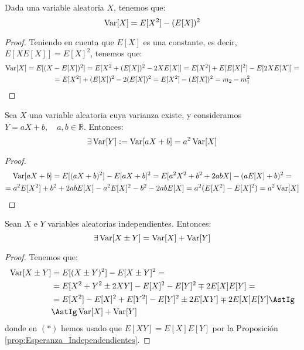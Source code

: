 \begin{prop}
    Dada una variable aleatoria $X$, tenemos que:
    \begin{equation*}
        \operatorname{Var}[X] = E[X^2] - (E[X])^2
    \end{equation*}
\end{prop}
\begin{proof}
    Teniendo en cuenta que $E[X]$ es una constante, es decir, $E[XE[X]]=E[X]^2$, tenemos que:
    \begin{multline*}
        \operatorname{Var}[X] = E[(X-E[X])^2] = E[X^2 + (E[X])^2 - 2XE[X]]
        = E[X^2] + E[E[X]^2] - E[2XE[X]] =\\=
        E[X^2] + (E[X])^2 -2(E[X])^2
        = E[X^2] - (E[X])^2 = m_2-m_1^2
    \end{multline*}
\end{proof}


\begin{prop}
    Sea $X$ una variable aleatoria cuya varianza existe, y consideramos $Y=aX+b,\quad a,b\in \mathbb{R}$. Entonces:
    \begin{equation*}
        \exists \operatorname{Var}[Y] := \operatorname{Var}[aX+b] = a^2\operatorname{Var}[X]
    \end{equation*}
\end{prop}
\begin{proof}
    \begin{multline*}
        \operatorname{Var}[aX+b]
        = E[(aX+b)^2] -E[aX+b]^2
        = E[a^2X^2 + b^2 +2abX] - (aE[X]+b)^2
        =\\= a^2E[X^2] + b^2 +2abE[X] -a^2E[X]^2 -b^2 -2abE[X] =  a^2(E[X^2] - E[X]^2) = a^2\operatorname{Var}[X]
    \end{multline*}
\end{proof}


\begin{prop}
    Sean $X$ e $Y$ variables aleatorias independientes. Entonces:
    \begin{equation*}
        \exists  \operatorname{Var}[X\pm Y] = \operatorname{Var}[X] + \operatorname{Var}[Y]
    \end{equation*}
\end{prop}
\begin{proof}
    Tenemos que:
    \begin{align*}
        \Var[X \pm Y] &= E[(X\pm Y)^2] - E[X\pm Y]^2
        =\\&= E[X^2 + Y^2 \pm 2XY] - E[X]^2 - E[Y]^2 \mp 2E[X]E[Y]
        =\\&= E[X^2] - E[X]^2 + E[Y^2] -E[Y]^2 \pm 2E[XY] \mp 2E[X]E[Y]
        \AstIg\\&\AstIg \Var[X] + \Var[Y]
    \end{align*}
    donde en $(\ast)$ hemos usado que $E[XY]=E[X]E[Y]$ por la Proposición \ref{prop:Esperanza_Independendientes}.
\end{proof}

